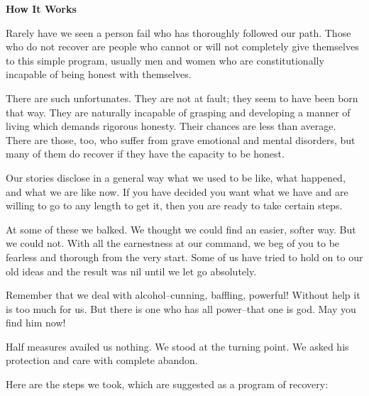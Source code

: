 \documentclass{beamer}
\begin{document}
\begin{frame}%
\textcolor{example}{\textbf{How It Works}}
\bigskip

Rarely have we seen a person fail who has thoroughly followed our path. Those who do not recover are people who cannot or will  not  completely  give  themselves  to  this  simple  program,  usually  men  and  women  who  are  constitutionally  incapable  of  being honest with themselves. 
\bigskip

There  are  such  unfortunates.  They  are  not  at  fault;  they  seem  to  have  been  born  that  way.  They  are  naturally  incapable  of  grasping  and  developing  a  manner  of  living  which  demands  rigorous  honesty.  Their  chances  are  less  than  average.  There  are  those,  too,  who  suffer  from  grave  emotional  and  mental  disorders,  but  many  of  them  do  recover  if  they  have  the    capacity to be honest. 
\bigskip

Our  stories  disclose  in  a  general  way  what  we  used  to  be  like,  what happened, and what we are like now. If you have decided you  want  what  we  have  and  are  willing  to  go  to  any  length  to  get it, then you are ready to take certain steps. 
\bigskip

At  some  of  these  we  balked.  We  thought  we  could  find  an  easier, softer way. But we could not. With all the earnestness at our command, we beg of you to be fearless and thorough from the very start. Some of us have tried to hold on to our old ideas and the result was nil until we let go absolutely. 
\bigskip

Remember   that   we   deal   with   alcohol--cunning,   baffling,   powerful! Without help it is too much for us. But there is one who has all power--that one is god. May you find him now! 
\bigskip

Half  measures  availed  us  nothing.  We  stood  at  the  turning  point.   We   asked   his   protection   and   care   with   complete      abandon. 
\bigskip

Here are the steps we took, which are suggested as a program of recovery:  
\bigskip


\end{frame}
\end{document}
